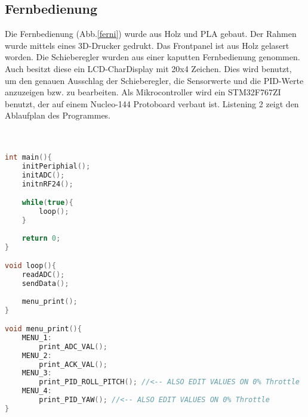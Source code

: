 \documentclass[12pt,a4paper, ngerman]{article}
\begin{document}
\subsection{Fernbedienung}
Die Fernbedienung (Abb.\ref{ferni}) wurde aus Holz und PLA gebaut. Der Rahmen wurde mittels eines 3D-Drucker gedrukt. Das Frontpanel ist aus Holz gelasert worden. Die Schieberegler wurden aus einer kaputten Fernbedienung genommen. Auch besitzt diese ein LCD-CharDisplay mit 20x4 Zeichen. Dies wird benutzt, um den genauen Ausschlag der Schieberegler, die Sensorwerte und die PID-Werte anzuzeigen bzw. zu bearbeiten. Als Mikrocontroller wird ein STM32F767ZI benutzt, der auf einem Nucleo-144 Protoboard verbaut ist. Listening 2 zeigt den Ablaufplan des Programmes.\\ \\ \\
\begin{lstlisting}[language=C++,caption=Programmablauf Pseudocode]
int main(){
	initPeriphial();
	initADC();
	initnRF24();

	while(true){
		loop();
	}
	
	return 0;
}

void loop(){
	readADC();
	sendData();
	
	menu_print();
}

void menu_print(){
	MENU_1:
		print_ADC_VAL();
	MENU_2:
		print_ACK_VAL();
	MENU_3:
		print_PID_ROLL_PITCH(); //<-- ALSO EDIT VALUES ON 0% Throttle
	MENU_4:
		print_PID_YAW(); //<-- ALSO EDIT VALUES ON 0% Throttle
}


\end{lstlisting}
\newpage
\end{document}
